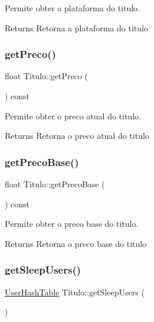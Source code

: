 Permite obter a plataforma do titulo. 

\begin{DoxyReturn}{Returns}
Retorna a plataforma do titulo 
\end{DoxyReturn}
\mbox{\label{class_titulo_a93725bdc2e98350e47b54fd76c0fa236}} 
\subsubsection{\texorpdfstring{get\+Preco()}{getPreco()}}
{\footnotesize\ttfamily float Titulo\+::get\+Preco (\begin{DoxyParamCaption}{ }\end{DoxyParamCaption}) const}



Permite obter o preco atual do titulo. 

\begin{DoxyReturn}{Returns}
Retorna o preco atual do titulo 
\end{DoxyReturn}
\mbox{\label{class_titulo_a5257cbaf35ad018001a7e48678795305}} 
\subsubsection{\texorpdfstring{get\+Preco\+Base()}{getPrecoBase()}}
{\footnotesize\ttfamily float Titulo\+::get\+Preco\+Base (\begin{DoxyParamCaption}{ }\end{DoxyParamCaption}) const}



Permite obter o preco base do titulo. 

\begin{DoxyReturn}{Returns}
Retorna o preco base do titulo 
\end{DoxyReturn}
\mbox{\label{class_titulo_ae38bebc95efb3405d5cd9ca71aa98ab2}} 
\subsubsection{\texorpdfstring{get\+Sleep\+Users()}{getSleepUsers()}}
{\footnotesize\ttfamily \mbox{\hyperlink{_titulo_8h_a0996281e9e5d419736dec228200cfdc5}{User\+Hash\+Table}} Titulo\+::get\+Sleep\+Users (\begin{DoxyParamCaption}{ }\end{DoxyParamCaption})\hspace{0.3cm}{\ttfamily [inline]}}

